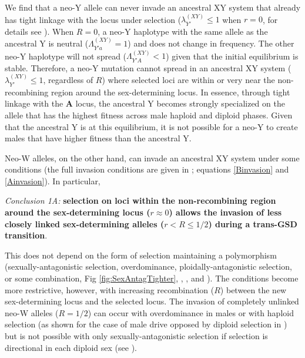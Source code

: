 \documentclass[10pt,letterpaper]{article}
\begin{document}
We find that a neo-Y allele can never invade an ancestral XY system that already has tight linkage with the locus under selection ($\lambda_{Y'}^{(XY)} \leq 1$ when $r=0$, for details see ). 
When $R=0$, a neo-Y haplotype with the same allele as the ancestral Y is neutral ($\Lambda_{Y'a}^{(XY)}=1$) and does not change in frequency.
The other neo-Y haplotype will not spread ($\Lambda_{Y'A}^{(XY)}<1$) given that the initial equilibrium is stable. 
Therefore, a neo-Y mutation cannot spread in an ancestral XY system ($\lambda_{Y'}^{(XY)} \leq 1$, regardless of $R$) where selected loci are within or very near the non-recombining region around the sex-determining locus.
In essence, through tight linkage with the $\mathbf{A}$ locus, the ancestral Y becomes strongly specialized on the allele that has the highest fitness across male haploid and diploid phases. 
Given that the ancestral Y is at this equilibrium, it is not possible for a neo-Y to create males that have higher fitness than the ancestral Y. 

Neo-W alleles, on the other hand, can invade an ancestral XY system under some conditions (the full invasion conditions are given in ; equations \ref{Binvasion} and \ref{Ainvasion}). 
In particular,
\vspace{0.5cm}

\noindent\textit{Conclusion 1A:}
\textbf{selection on loci within the non-recombining region around the sex-determining locus ($r\approx0$) allows the invasion of less closely linked sex-determining alleles ($r<R\leq1/2$) during a trans-GSD transition}.
\vspace{0.5cm}

\noindent This does not depend on the form of selection maintaining a polymorphism (sexually-antagonistic selection, overdominance, ploidally-antagonistic selection, or some combination, Fig \ref{fig:SexAntagTighter}, , , and ).  
The conditions become more restrictive, however, with increasing recombination ($R$) between the new sex-determining locus and the selected locus.  
The invasion of completely unlinked neo-W alleles ($R = 1/2$) can occur with overdominance in males or with haploid selection (as shown for the case of male drive opposed by diploid selection in \cite{Kozielska:2010vm}) but is not possible with only sexually-antagonistic selection if selection is directional in each diploid sex (see ).
\end{document}
